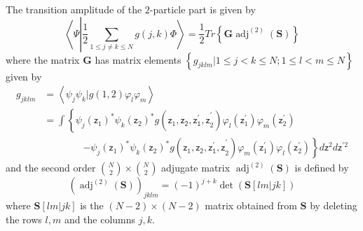 \documentclass[aps,preprint]{revtex4}%
\begin{document}
The transition amplitude of the $2$-particle part is given by
\begin{equation}
\left\langle \Psi\left\vert \frac{1}{2}%
{\displaystyle\sum\limits_{1\leq j\neq k\leq N}}
g\left(  j,k\right)  \right.  \Phi\right\rangle =\frac{1}{2}Tr\left\{
\mathbf{G}\operatorname{adj}^{\left(  2\right)  }\left(  \mathbf{S}\right)
\right\}
\end{equation}
where the matrix $\mathbf{G}$ has matrix elements $\left\{  g_{jklm}|1\leq
j<k\leq N;1\leq l<m\leq N\right\}  $ given by
\begin{align}
g_{jklm}  &  =\left\langle \psi_{j}\psi_{k}|g\left(  1,2\right)  \varphi
_{l}\varphi_{m}\right\rangle \nonumber\\
&  =%
{\displaystyle\int}
\left\{  \psi_{j}\left(  \mathsf{z}_{1}\right)  ^{\ast}\psi_{k}\left(
\mathsf{z}_{2}\right)  ^{\ast}g\left(  \mathsf{z}_{1}\mathsf{,\mathsf{z}%
_{2},\mathsf{z}_{1}^{\prime},z}_{2}^{\prime}\right)  \varphi_{l}\left(
\mathsf{z}_{1}^{\prime}\right)  \varphi_{m}\left(  \mathsf{z}_{2}^{\prime
}\right)  \right. \nonumber\\
&  \qquad\qquad\left.  -\psi_{j}\left(  \mathsf{z}_{1}\right)  ^{\ast}\psi
_{k}\left(  \mathsf{z}_{2}\right)  ^{\ast}g\left(  \mathsf{z}_{1}%
\mathsf{,\mathsf{z}_{2},\mathsf{z}_{1}^{\prime},z}_{2}^{\prime}\right)
\varphi_{m}\left(  \mathsf{z}_{1}^{\prime}\right)  \varphi_{l}\left(
\mathsf{z}_{2}^{\prime}\right)  \right\}  d\mathsf{z}^{2}d\mathsf{z}^{\prime2}%
\end{align}
and the second order $\binom{N}{2}\times\binom{N}{2}$ adjugate matrix
$\operatorname{adj}^{\left(  2\right)  }\left(  \mathbf{S}\right)  $ is
defined by
\begin{equation}
\left(  \operatorname{adj}^{\left(  2\right)  }\left(  \mathbf{S}\right)
\right)  _{jklm}=\left(  -1\right)  ^{j+k}\det\left(  \mathbf{S}\left[
lm|jk\right]  \right)
\end{equation}
where $\mathbf{S}\left[  lm|jk\right]  $ is the $\left(  N-2\right)
\times\left(  N-2\right)  $ matrix obtained from $\mathbf{S}$ by deleting the
rows $l,m$ and the columns $j,k$.
\end{document}
